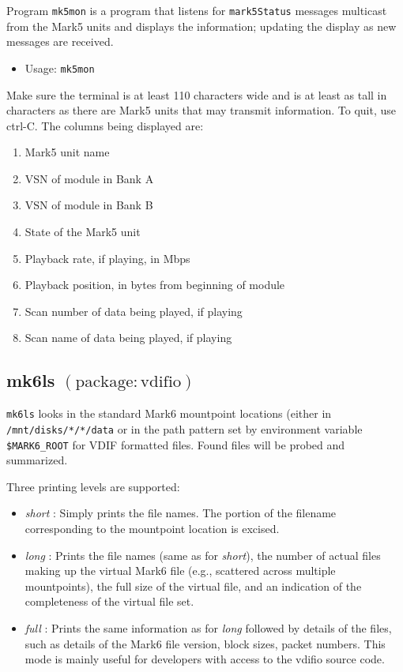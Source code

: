 Program {\tt mk5mon} is a program that listens for {\tt mark5Status} messages multicast from the Mark5 units and displays the information; updating the display as new messages are received.

\begin{itemize}
\item[] Usage: {\tt mk5mon}
\end{itemize}

Make sure the terminal is at least 110 characters wide and is at least as tall in characters as there are Mark5 units that may transmit information.
To quit, use ctrl-C.
The columns being displayed are:
\begin{enumerate}
\item Mark5 unit name
\item VSN of module in Bank A
\item VSN of module in Bank B
\item State of the Mark5 unit
\item Playback rate, if playing, in Mbps
\item Playback position, in bytes from beginning of module
\item Scan number of data being played, if playing
\item Scan name of data being played, if playing
\end{enumerate}









\subsection{mk6ls {\small $\mathrm{(package: vdifio)}$} \label{sec:mk6ls}}

{\tt mk6ls} looks in the standard Mark6 mountpoint locations (either in {\tt /mnt/disks/*/*/data} or in the path pattern set by environment variable {\tt \$MARK6\_ROOT} for VDIF formatted files.
Found files will be probed and summarized.

Three printing levels are supported:
\begin{itemize}
\item {\em short} : Simply prints the file names.  The portion of the filename corresponding to the mountpoint location is excised.
\item {\em long} : Prints the file names (same as for {\em short}), the number of actual files making up the virtual Mark6 file (e.g., scattered across multiple mountpoints), the full size of the virtual file, and an indication of the completeness of the virtual file set.
\item {\em full} : Prints the same information as for {\em long} followed by details of the files, such as details of the Mark6 file version, block sizes, packet numbers.  This mode is mainly useful for developers with access to the vdifio source code.
\end{itemize}

